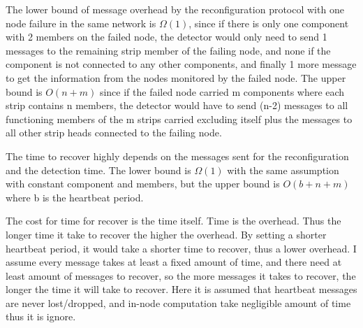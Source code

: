 The lower bound of message overhead by the reconfiguration protocol
with one node failure in the same network is $\Omega(1)$, since if there is only
one component with 2 members on the failed node, the detector would only need to
send 1 messages to the remaining strip member of the failing node, and none if
the component is not connected to any other components, and finally 1 more
message to get the information from the nodes monitored by the failed node. The
upper bound is $O(n + m)$ since if the failed node carried m components where each
strip contains n members, the detector would have to send (n-2) messages to all
functioning members of the m strips carried excluding itself plus the messages
to all other strip heads connected to the failing node. 

The time to recover highly depends on the messages sent for the reconfiguration
and the detection time. The lower bound is $\Omega(1)$ with the same assumption
with constant component and members, but the upper bound is $O(b + n + m)$ where
b is the heartbeat period.

The cost for time for recover is the time itself. Time is the overhead. Thus the
longer time it take to recover the higher the overhead. By setting a shorter
heartbeat period, it would take a shorter time to recover, thus a lower
overhead. I assume every message takes at least a fixed amount of time, and
there need at least amount of messages to recover, so the more messages it takes
to recover, the longer the time it will take to recover. Here it is assumed that
heartbeat messages are never lost/dropped, and in-node computation take
negligible amount of time thus it is ignore. %

